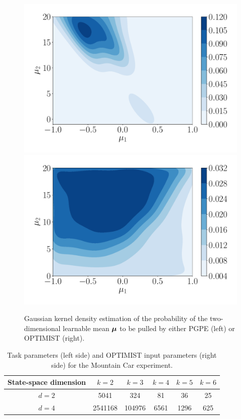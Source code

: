 \begin{figure}[t!] 
\centering
\includegraphics[width=.5\textwidth]{Images/MCgainPGPE.pdf}\hfill
\includegraphics[width=.5\textwidth]{Images/MCgainOPTIMIST.pdf}
\caption{Gaussian kernel density estimation \cite{scott2015multivariate} of the probability of the two-dimensional learnable mean $\boldsymbol{\mu}$ to be pulled by either \gls{PGPE} (left) or \gls{OPTIMIST} (right).} 
\label{fig:MCgain}
\end{figure} 

\begin{table}[t!]
\centering
\begin{tabular}{c|ccccc} 
\toprule
State-space dimension & $k=2$ & $k=3$ & $k=4$ & $k=5$ & $k=6$\\
\midrule
$d=2$ & 5041 & 324 & 81 & 36 & 25\\
$d=4$ & 2541168 & 104976 & 6561 & 1296 & 625\\
\bottomrule
\end{tabular}
\caption{Task parameters (left side) and \gls{OPTIMIST} input parameters (right side) for the Mountain Car experiment.}
\label{tab:granularity}
\end{table}

